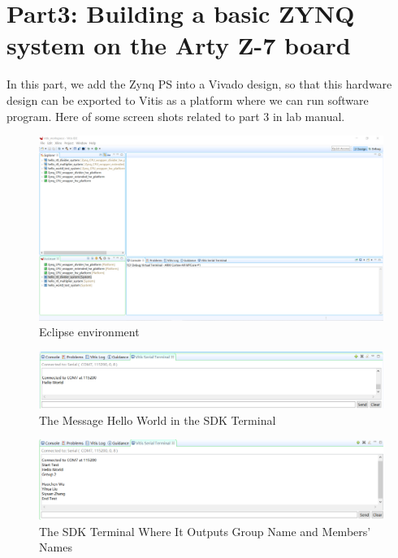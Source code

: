 \documentclass[a4paper]{article}
\begin{document}
\section{Part3: Building a basic ZYNQ system on the Arty Z-7 board}
In this part, we add the Zynq PS into a Vivado design, so that this hardware design can be exported to Vitis as a platform where we can run software program. Here of some screen shots related to part 3 in lab manual.
\begin{figure}[H]
    \centering
    \includegraphics[width=14cm]{1}
    \caption{Eclipse environment}
    \label{fig:1}
\end{figure}

\begin{figure}[H]
    \centering
    \includegraphics[width=14cm]{2_new}
    \caption{The Message Hello World in the SDK Terminal}
    \label{fig:2}
\end{figure}

\begin{figure}[H]
    \centering
    \includegraphics[width=14cm]{3_new}
    \caption{The SDK Terminal Where It Outputs Group Name and Members’ Names}
    \label{fig:3}
\end{figure}
\end{document}
